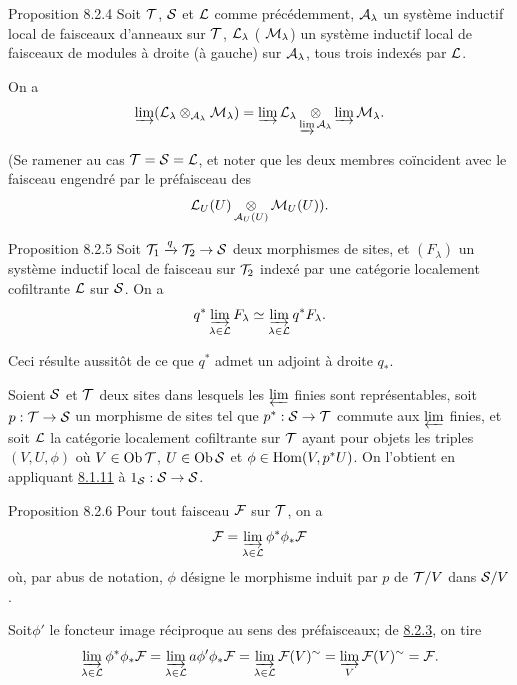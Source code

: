 \documentclass[10pt]{../fichiers-configuration-latex/smfart}
\begin{document}
\begin{enonce*}{Proposition 8.2.4}
Soit ${\mathcal T}$, ${\mathcal S}$ et ${\mathcal L}$ comme précédemment,
${\mathcal A}_{\lambda}$ un système inductif local de faisceaux
d'anneaux sur ${\mathcal T}$, ${\mathcal L}_{\lambda}$ (\resp
${\mathcal M}_{\lambda}$) un système inductif local de faisceaux de
modules à droite (\resp à gauche) sur ${\mathcal A}_{\lambda}$, tous
trois indexés par ${\mathcal L}$.

On a
$$
\varinjlim ({\mathcal L}_{\lambda}
\otimes_{{\mathcal A}_{\lambda}} {\mathcal M}_{\lambda}) =
\varinjlim {\mathcal L}_{\lambda} \mathop{\otimes}_{\varinjlim
    {\mathcal A}_{\lambda}} \varinjlim {\mathcal M}_{\lambda}{}.
$$
\end{enonce*}

(Se ramener au cas ${\mathcal T} = {\mathcal S} = {\mathcal L}$, et noter que les
deux membres coïncident avec le faisceau engendré par le préfaisceau
des
$$
{\mathcal L}_U (U) \mathop{\otimes}_{{\mathcal A}_{U} (U)} {\mathcal M}_U (U) ){}.
$$

\begin{enonce*}{Proposition 8.2.5}
Soit $\Tt_1 \xrightarrow{q} \Tt_2 \to \Ss$ deux morphismes de sites,
et $(F_{\lambda})$ un système inductif local de faisceau sur ${\mathcal T}_2$
indexé par une catégorie localement cofiltrante ${\mathcal L}$ sur ${\mathcal S}$. On
a
$$
q^{\ast} \varinjlim_{\lambda \in {\mathcal L}} F_{\lambda} \simeq
\varinjlim_{\lambda \in {\mathcal L}} q^{\ast} F_{\lambda} {}.
$$
\end{enonce*}

Ceci résulte aussitôt de ce que $q^{\ast}$ admet un adjoint à droite $q_{\ast}$.

Soient ${\mathcal S}$ et ${\mathcal T}$ deux sites dans lesquels les
$\varprojlim$ finies sont représentables, soit
$p:\Tt\to\Ss$ un morphisme de sites tel que $p^{\ast}:\Ss\to\Tt$
commute aux $\varprojlim$ finies, et soit ${\mathcal L}$
la catégorie localement cofiltrante sur ${\mathcal T}$ ayant pour
objets les triples $(V, U, \phi)$ où $V \in \operatorname{Ob} {\mathcal T}$, $U \in
\operatorname{Ob} {\mathcal S}$ et $\phi \in \operatorname{Hom} (V, p^{\ast} U)$. On l'obtient en appliquant \hyperref[V.lem8.1.11]{8.1.11}
à $1_{\Ss} : \Ss \to \Ss$.

\begin{enonce*}{Proposition 8.2.6}
Pour tout faisceau ${\mathcal F}$ sur ${\mathcal T}$, on a
$$
{\mathcal F} = \varinjlim_{\lambda \in {\mathcal L}} \phi^{\ast}
\phi_{\ast} {\mathcal F}
$$
où, par abus de notation, $\phi$ désigne le morphisme induit par $p$
de ${\mathcal T}/V$ dans ${\mathcal S}/V$.
\end{enonce*}

Soit\pageoriginale $\phi'$ le foncteur image réciproque au sens des préfaisceaux;
de \hyperref[V.lem8.2.3]{8.2.3}, on tire
$$
\varinjlim_{\lambda \in {\mathcal L}} \phi^{\ast} \phi_{\ast}
{\mathcal F} = \varinjlim_{\lambda \in {\mathcal L}} a {\phi}'
\phi_{\ast} {\mathcal F} = \varinjlim_{\lambda \in {\mathcal L}}
{\mathcal F} (V)^{\sim} = \varinjlim_{V} {\mathcal F} (V)^{\sim}
= {\mathcal F}{}.
$$
\end{document}
